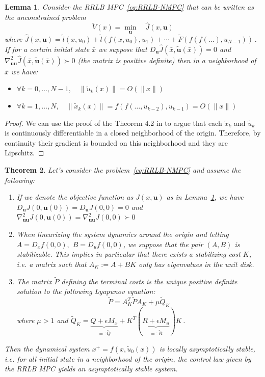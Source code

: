 \documentclass[conference]{IEEEtran}
\newtheorem{theorem}{Theorem}[section]
\newtheorem{lemma}[theorem]{Lemma}
\theoremstyle{definition}
\theoremstyle{remark}
\def\bf#1{\mathbf{#1}}
\begin{document}
\begin{lemma}\label{thm:Lipschitzianity}
	Consider the RRLB MPC~\eqref{eq:RRLB-NMPC} that can be written as the unconstrained problem
	$$\tilde{V}(x)=\underset{\bf{u}}{\min} \quad \hat{J}(x,\bf{u})$$
	where $\hat{J}(x,\bf{u})=\tilde{l}(x,u_0)+\tilde{l}(f(x,u_0),u_1)+\cdots+\tilde{F}(f(f(...),u_{N-1}))$\,.
	If for a certain initial state $\bar{x}$ we suppose that $D_\bf{u}\hat{J}(\bar{x},\tilde{\bf{u}}(\bar{x}))=0$ and $\nabla_{\bf{u}\bf{u}}^2\hat{J}(\bar{x}, \tilde{\bf{u}}(\bar{x}))\succ 0$ (the matrix is positive definite) then in a neighborhood of $\bar{x}$ we have:
	\begin{itemize}[label=\textbullet]
		\item $\forall k=0,\ldots,N-1,\quad \|\tilde{u}_k(x)\|=O(\|x\|)$
		\item $\forall k=1,\ldots,N,\quad \|\tilde{x}_k(x)\|=f(f(\ldots,u_{k-2}),u_{k-1})=O(\|x\|)$
	\end{itemize}
\end{lemma}
\begin{proof}
	We can use the proof of the Theorem 4.2 in \cite{lectures-parametric-optimization} to argue that each $\tilde{x}_k$ and $\tilde{u}_k$ is continuously differentiable in a closed neighborhood of the origin.
	Therefore, by continuity their gradient is bounded on this neighborhood and they are Lipschitz.
\end{proof}

\begin{theorem}\label{thm:nominal-stability}
	Let's consider the problem~\eqref{eq:RRLB-NMPC} and assume the following:
	\begin{enumerate}
		\item If we denote the objective function as $J(x,\bf{u})$ as in Lemma~\ref{thm:Lipschitzianity}, we have $D_\bf{u}J(0,\bf{u}(0))=D_\bf{u}J(0,0)=0$ and $\nabla^2_{\bf{u}\bf{u}}J(0,\bf{u}(0))=\nabla^2_{\bf{u}\bf{u}}J(0,0)\succ 0$

		\item When linearizing the system dynamics around the origin and letting $A=D_xf(0,0),$ $B=D_uf(0,0)$, we suppose that the pair $(A,B)$ is stabilizable.
		This implies in particular that there exists a stabilizing cost $K$, i.e. a matrix such that $A_K:=A+BK$ only has eigenvalues in the unit disk.

		\item The matrix $\tilde{P}$ defining the terminal costs is the unique positive definite solution to the following Lyapunov equation:
		\begin{equation}
			\label{eq:Lyapunov}
			\tilde{P}=A_K^T\tilde{P}A_K+\mu \tilde{Q}_K
		\end{equation}
		where $\mu>1$ and $\tilde{Q}_K=\underbrace{Q+\epsilon M_x}_{=:\tilde{Q}}+K^T(\underbrace{R+\epsilon M_u}_{=:\tilde{R}})K$\,.
	\end{enumerate}
	Then the dynamical system $x^+=f(x,\tilde{u}_0(x))$ is locally asymptotically stable, i.e. for all initial state in a neighborhood of the origin, the control law given by the RRLB MPC yields an asymptotically stable system.
\end{theorem}
\end{document}
